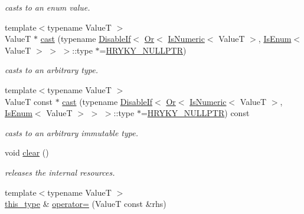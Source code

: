 \begin{DoxyCompactItemize}
\begin{DoxyCompactList}\small\item\em casts to an enum value. \end{DoxyCompactList}\item 
{\footnotesize template$<$typename Value\-T $>$ }\\Value\-T $\ast$ \hyperlink{classhryky_1_1_any_a37f25821261f4c71fbe4f319837d327d}{cast} (typename \hyperlink{classhryky_1_1_disable_if}{Disable\-If}$<$ \hyperlink{classhryky_1_1_or}{Or}$<$ \hyperlink{classhryky_1_1_is_numeric}{Is\-Numeric}$<$ Value\-T $>$, \hyperlink{classhryky_1_1_is_enum}{Is\-Enum}$<$ Value\-T $>$ $>$ $>$\-::type $\ast$=\hyperlink{common_8h_a4cd4ac09cfcdbd6b30ee69afc156e210}{H\-R\-Y\-K\-Y\-\_\-\-N\-U\-L\-L\-P\-T\-R})
\begin{DoxyCompactList}\small\item\em casts to an arbitrary type. \end{DoxyCompactList}\item 
\hypertarget{classhryky_1_1_any_af8beccd8c9d59f2c45fc4c1037eb5d94}{{\footnotesize template$<$typename Value\-T $>$ }\\Value\-T const $\ast$ \hyperlink{classhryky_1_1_any_af8beccd8c9d59f2c45fc4c1037eb5d94}{cast} (typename \hyperlink{classhryky_1_1_disable_if}{Disable\-If}$<$ \hyperlink{classhryky_1_1_or}{Or}$<$ \hyperlink{classhryky_1_1_is_numeric}{Is\-Numeric}$<$ Value\-T $>$, \hyperlink{classhryky_1_1_is_enum}{Is\-Enum}$<$ Value\-T $>$ $>$ $>$\-::type $\ast$=\hyperlink{common_8h_a4cd4ac09cfcdbd6b30ee69afc156e210}{H\-R\-Y\-K\-Y\-\_\-\-N\-U\-L\-L\-P\-T\-R}) const }\label{classhryky_1_1_any_af8beccd8c9d59f2c45fc4c1037eb5d94}

\begin{DoxyCompactList}\small\item\em casts to an arbitrary immutable type. \end{DoxyCompactList}\item 
\hypertarget{classhryky_1_1_any_a307624acbd5252242b0665a0d5d5e62e}{void \hyperlink{classhryky_1_1_any_a307624acbd5252242b0665a0d5d5e62e}{clear} ()}\label{classhryky_1_1_any_a307624acbd5252242b0665a0d5d5e62e}

\begin{DoxyCompactList}\small\item\em releases the internal resources. \end{DoxyCompactList}\item 
\hypertarget{classhryky_1_1_any_a84875d62c0f9f76ddcfb896b8ab6a275}{{\footnotesize template$<$typename Value\-T $>$ }\\\hyperlink{classhryky_1_1_any_accb3d649460111ed6f04293f3e5865bc}{this\-\_\-type} \& \hyperlink{classhryky_1_1_any_a84875d62c0f9f76ddcfb896b8ab6a275}{operator=} (Value\-T const \&rhs)}\label{classhryky_1_1_any_a84875d62c0f9f76ddcfb896b8ab6a275}


\end{DoxyCompactItemize}
